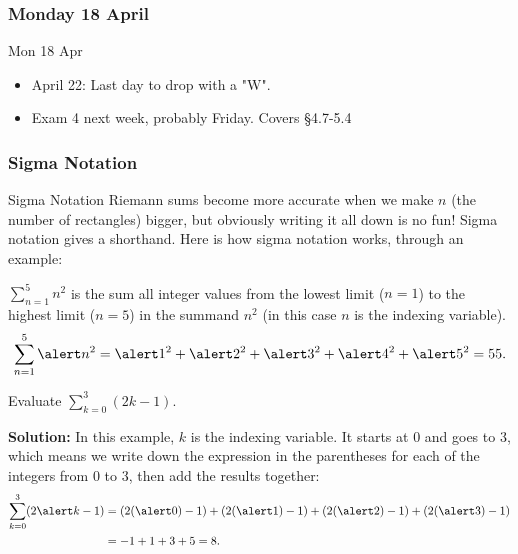 \documentclass[cal1spr16Lectures.tex]{subfiles}
\begin{document}

\subsubsection{\bf Monday 18 April}

\begin{frame}[allowframebreaks]{Mon 18 Apr}
\begin{itemize}
\item April 22: Last day to drop with a "W".
\item Exam 4 next week, probably Friday.  Covers \S 4.7-5.4
\end{itemize}
\end{frame}

\subsubsection{Sigma Notation}

\begin{frame}{\small Sigma Notation}\footnotesize
Riemann sums become more accurate when we make $n$ (the number of rectangles) bigger, but obviously writing it all down is no fun!  Sigma notation gives a shorthand.  Here is how sigma notation works, through an example: 
\begin{ex} 
$\sum_{n=1}^5 n^2$ is the sum all integer values from the lowest limit ($n=1$) to the highest limit ($n=5$) in the summand $n^2$ (in this case $n$ is the indexing variable).  
\[\sum_{n=1}^5 \alert n^2 = \alert 1^2+\alert 2^2+\alert 3^2+\alert 4^2+\alert 5^2=55.\] 
\end{ex}
\end{frame}

\begin{frame}\small
\begin{ex} 
Evaluate $\sum_{k=0}^3 (2k-1)$. 
\end{ex}
\footnotesize
{\bf Solution:} In this example, $k$ is the indexing variable.  It starts at $0$ and goes to $3$, which means we write down the expression in the parentheses for each of the integers from $0$ to $3$, then add the results together:
\begin{align*}
\sum_{k=0}^3(2\alert k-1) &= (2(\alert 0)-1)+(2(\alert 1)-1)+(2(\alert 2)-1)+(2(\alert 3)-1) \\
	&= -1+1+3+5 = 8.
\end{align*}
\end{frame}
\end{document}
